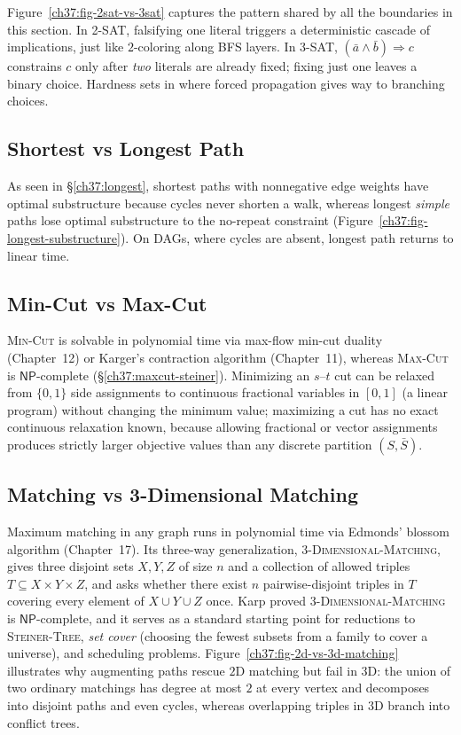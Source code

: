 \begin{intuitionbox}
Figure~\ref{ch37:fig-2sat-vs-3sat} captures the pattern shared by all the boundaries in this section. In \textsc{2-SAT}, falsifying one literal triggers a deterministic cascade of implications, just like $2$-coloring along BFS layers. In \textsc{3-SAT}, $(\bar{a}\wedge\bar{b})\Rightarrow c$ constrains $c$ only after \emph{two} literals are already fixed; fixing just one leaves a binary choice. Hardness sets in where forced propagation gives way to branching choices.
\end{intuitionbox}

\subsection{Shortest vs Longest Path}

As seen in \S\ref{ch37:longest}, shortest paths with nonnegative edge weights have optimal substructure
because cycles never shorten a walk, whereas longest \emph{simple} paths lose optimal substructure to the no-repeat
constraint (Figure~\ref{ch37:fig-longest-substructure}). On DAGs, where cycles are absent, longest path returns to linear time.

\subsection{Min-Cut vs Max-Cut}

\textsc{Min-Cut} is solvable in polynomial time via max-flow min-cut duality (Chapter~12) or Karger's contraction algorithm (Chapter~11), whereas
\textsc{Max-Cut} is $\mathsf{NP}$-complete (\S\ref{ch37:maxcut-steiner}).
Minimizing an $s$--$t$ cut can be relaxed from $\{0,1\}$ side assignments to continuous fractional variables in $[0,1]$ (a linear program) without changing the minimum value; maximizing a cut has no exact continuous relaxation known, because allowing fractional or vector assignments produces strictly larger objective values than any discrete partition $(S,\bar{S})$.

\subsection{Matching vs 3-Dimensional Matching}

Maximum matching in any graph runs in polynomial time via Edmonds' blossom algorithm (Chapter~17).
Its three-way generalization, \textsc{3-Dimensional-Matching}, gives three disjoint sets $X,Y,Z$ of size $n$ and a collection of allowed triples $T\subseteq X\times Y\times Z$, and asks whether there exist $n$ pairwise-disjoint triples in $T$ covering every element of $X\cup Y\cup Z$ once. Karp proved \textsc{3-Dimensional-Matching} is $\mathsf{NP}$-complete, and it serves as a standard starting point for reductions to \textsc{Steiner-Tree}, \emph{set cover} (choosing the fewest subsets from a family to cover a universe), and scheduling problems. Figure~\ref{ch37:fig-2d-vs-3d-matching} illustrates why augmenting paths rescue $2$D matching but fail in $3$D: the union of two ordinary matchings has degree at most $2$ at every vertex and decomposes into disjoint paths and even cycles, whereas overlapping triples in $3$D branch into conflict trees.

